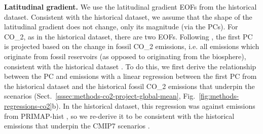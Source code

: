 \textbf{Latitudinal gradient.}
We use the latitudinal gradient EOFs from the historical dataset.
Consistent with the historical dataset,
we assume that the shape of the latitudinal gradient does not change,
only its magnitude (via the PCs).
For CO_2, as in the historical dataset, there are two EOFs.
Following \citet{meinshausen_ssp-ghgs_2020},
the first PC is projected based on the change in fossil CO_2 emissions,
i.e. all emissions which originate from fossil reservoirs (as opposed to originating from the biosphere),
consistent with the historical dataset \citep{nicholls_historical-ghgs_2026}.
To do this, we first derive the relationship between the PC and emissions
with a linear regression between the first PC from the historical dataset
and the historical fossil CO_2 emissions that underpin the scenarios
(Sect.~\ref{sssec:methods-co2-project-global-mean}, Fig.~\ref{fig:methods-regressions-co2}b).
In the historical dataset, this regression was against emissions from PRIMAP-hist
\citep{nicholls_historical-ghgs_2026},
so we re-derive it to be consistent with the historical emissions that underpin the CMIP7 scenarios \citep[][and references therein]{kikstra_scenariomip-emissions_2026}.
